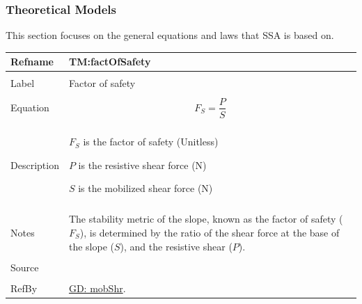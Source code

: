 \documentclass[12pt]{article}
\begin{document}
\subsubsection{Theoretical Models}
\label{Sec:TMs}
This section focuses on the general equations and laws that SSA is based on.
~\newline
 \noindent \begin{minipage}{\textwidth}
\begin{tabular}{p{} p{}}
\toprule \textbf{Refname} & \textbf{TM:factOfSafety}
\label{TM:factOfSafety}
\\ \midrule \\
Label & Factor of safety
        \\ \midrule \\
        Equation & \begin{displaymath}
                   {F_{S}}=\frac{P}{S}
                   \end{displaymath}
                   \\ \midrule \\
                   Description & \begin{symbDescription}
                                 \item{${F_{S}}$ is the factor of safety (Unitless)}
                                 \item{$P$ is the resistive shear force (N)}
                                 \item{$S$ is the mobilized shear force (N)}
                                 \end{symbDescription}
                                 \\ \midrule \\
                                 Notes & The stability metric of the slope, known as the factor of safety (${F_{S}}$), is determined by the ratio of the shear force at the base of the slope ($S$), and the resistive shear ($P$).
                                         \\ \midrule \\
                                         Source & \cite{fredlund1977}
                                                  \\ \midrule \\
                                                  RefBy & \hyperref[GD:mobShr]{GD: mobShr}.
\\ \bottomrule \end{tabular}
\end{minipage}\\
\end{document}
